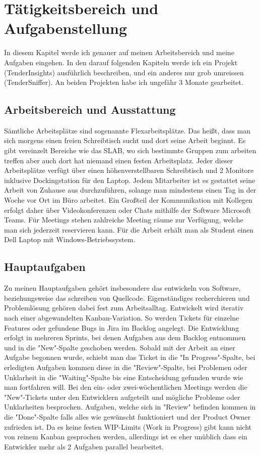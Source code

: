 \chapter{Tätigkeitsbereich und Aufgabenstellung}
In diesem Kapitel werde ich genauer auf meinen Arbeitsbereich und meine Aufgaben eingehen.
In den darauf folgenden Kapiteln werde ich ein Projekt (TenderInsights) ausführlich beschreiben, und ein anderes nur
grob umreissen (TenderSniffer). An beiden Projekten habe ich ungefähr 3 Monate gearbeitet.

\section{Arbeitsbereich und Ausstattung}
Sämtliche Arbeitsplätze sind sogenannte Flexarbeitsplätze. Das heißt, dass man sich morgens einen freien Schreibtisch
sucht und dort seine Arbeit beginnt. Es gibt vereinzelt Bereiche wie das SLAB, wo sich bestimmte Gruppen zum arbeiten
treffen aber auch dort hat niemand einen festen Arbeitsplatz. Jeder dieser Arbeitsplätze verfügt über einen
höhenverstellbaren Schreibtisch und 2 Monitore inklusive Dockingstation für den Laptop. Jedem Mitarbeiter ist es
gestattet seine Arbeit von Zuhause aus durchzuführen, solange man mindestens einen Tag in der Woche vor Ort im Büro
arbeitet. Ein Großteil der Kommunikation mit Kollegen erfolgt daher über Videokonferenzen oder Chats mithilfe der
Software Microsoft Teams. Für Meetings stehen zahlreiche Meeting räume zur Verfügung, welche man sich jederzeit
reservieren kann. Für die Arbeit erhält man als Student einen Dell Laptop mit Windows-Betriebssystem. 


\section{Hauptaufgaben}
Zu meinen Hauptaufgaben gehört insbesondere das entwickeln von Software, beziehungsweise das schreiben von Quellcode.
Eigenständiges recherchieren und Problemlösung gehören dabei fest zum Arbeitsalltag. Entwickelt wird iterativ nach einer
abgewandelten Kanban-Variation. So werden Tickets für einzelne Features oder gefundene Bugs in Jira im Backlog angelegt.
Die Entwicklung erfolgt in mehreren Sprints, bei denen Aufgaben aus dem Backlog entnommen und in die "New"-Spalte
geschoben werden. Sobald mit der Arbeit an einer Aufgabe begonnen wurde, schiebt man das Ticket in die "In
Progress"-Spalte, bei erledigten Aufgaben kommen diese in die "Review"-Spalte, bei Problemen oder Unklarheit in die
"Waiting"-Spalte bis eine Entscheidung gefunden wurde wie man fortfahren will. Bei den ein- oder zwei-wöchentlichen
Meetings werden die "New"-Tickets unter den Entwicklern aufgeteilt und mögliche Probleme oder Unklarheiten besprochen.
Aufgaben, welche sich in "Review" befinden kommen in die "Done"-Spalte falls alles wie gewünscht funktioniert und der
Product Owner zufrieden ist. Da es keine festen WIP-Limits (Work in Progress) gibt kann nicht von reinem Kanban
gesprochen werden, allerdings ist es eher unüblich dass ein Entwickler mehr als 2 Aufgaben parallel bearbeitet.


